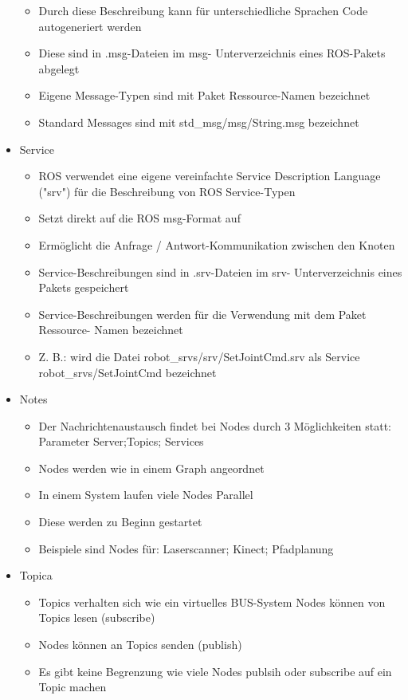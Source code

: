 \begin{itemize}
\begin{itemize}
\item Durch diese Beschreibung kann für unterschiedliche Sprachen Code autogeneriert
werden
\item Diese sind in .msg-Dateien im msg- Unterverzeichnis eines ROS-Pakets abgelegt
\item Eigene Message-Typen sind mit Paket Ressource-Namen bezeichnet
\item Standard Messages sind mit std\_msg/msg/String.msg bezeichnet
\end{itemize}
\item Service
\begin{itemize}
 \item ROS verwendet eine eigene vereinfachte Service Description Language ("srv") für die
Beschreibung von ROS Service-Typen
\item Setzt direkt auf die ROS msg-Format auf
\item Ermöglicht die Anfrage / Antwort-Kommunikation zwischen den Knoten
\item Service-Beschreibungen sind in .srv-Dateien im srv- Unterverzeichnis eines Pakets
gespeichert
\item Service-Beschreibungen werden für die Verwendung mit dem Paket Ressource-
Namen bezeichnet
\item Z. B.: wird die Datei robot\_srvs/srv/SetJointCmd.srv als Service
robot\_srvs/SetJointCmd bezeichnet
\end{itemize}
\item Notes
\begin{itemize}
 \item Der Nachrichtenaustausch findet bei Nodes durch 3 Möglichkeiten statt: Parameter
Server;Topics; Services
\item Nodes werden wie in einem Graph angeordnet
\item In einem System laufen viele Nodes Parallel
\item Diese werden zu Beginn gestartet
\item Beispiele sind Nodes für: Laserscanner; Kinect; Pfadplanung
\end{itemize}
\item Topica
\begin{itemize}
 \item Topics verhalten sich wie ein virtuelles BUS-System Nodes können von Topics lesen
(subscribe)
\item Nodes können an Topics senden (publish)
\item Es gibt keine Begrenzung wie viele Nodes publsih oder subscribe auf ein Topic
machen
\end{itemize}
\end{itemize}
